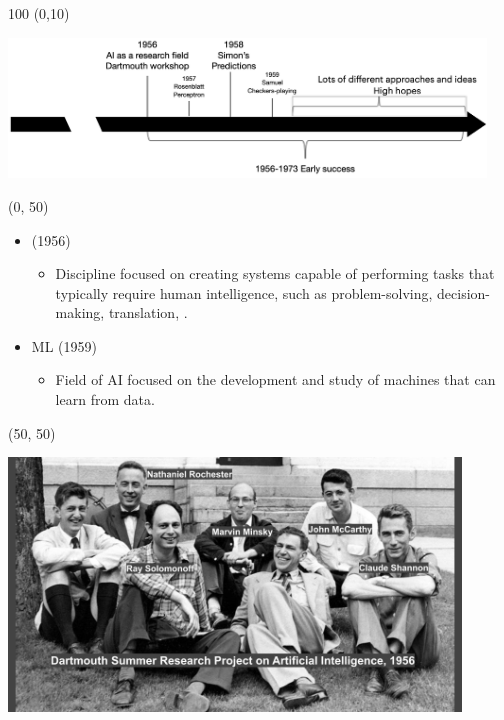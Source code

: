 \begin{frame}
  \begin{textblock}{100} (0,10)
    \begin{center}
      \includegraphics[width=0.95\textwidth]{img/ai_history_1956_1973.png}
    \end{center}
  \end{textblock}

  \begin{textblock}{50}(0, 50)
    \begin{itemize}
      \item {} (1956)
        \begin{itemize}
        \item \footnotesize Discipline focused on creating systems capable of
          performing tasks that typically require human intelligence, such as
          problem-solving, decision-making, translation, \etc{}.
        \end{itemize}
      \item<2-> \acl{ML} (1959)
        \begin{itemize}
        \item \footnotesize Field of AI focused on the development and study of machines that can learn from data.
        \end{itemize}
      \end{itemize}
    \end{textblock}

    \begin{textblock}{50}(50, 50)
      \begin{center}
        \includegraphics[width=0.9\textwidth]{img/dartmouth-conference.jpg}
      \end{center}
    \end{textblock}

\end{frame}


